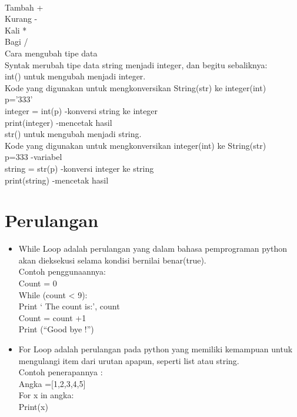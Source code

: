 \documentclass[a4paper,12pt]{report}
\begin{document}
\paragraph{}
Tambah		+\\
Kurang		-\\
Kali		*\\
Bagi		/\\
Cara mengubah tipe data\\
Syntak merubah tipe data string menjadi integer, dan begitu sebaliknya:\\
int() untuk mengubah menjadi integer.\\
Kode yang digunakan untuk mengkonversikan String(str) ke integer(int)\\
p=’333’\\
integer = int(p) -konversi string ke integer\\
print(integer) -mencetak hasil\\
str() untuk mengubah menjadi string.\\
Kode yang digunakan untuk mengkonversikan integer(int) ke String(str)\\
p=333 -variabel\\ 
string = str(p) -konversi integer ke string\\ 
print(string) -mencetak hasil\\
\section*{Perulangan}
\begin{itemize}
\item While Loop adalah perulangan yang dalam bahasa pemprograman python akan dieksekusi selama kondisi bernilai benar(true).\\
Contoh penggunaannya:\\
Count = 0\\
While (count  <  9):\\
	Print ‘ The count is:’, count\\
	Count = count +1\\
Print (“Good bye !”)\\

\item For Loop adalah perulangan pada python yang memiliki kemampuan untuk mengulangi item dari urutan apapun, seperti list atau string.\\
Contoh penerapannya :\\
Angka =[1,2,3,4,5]\\
For x in angka:\\
Print(x)\\
\end{itemize}
 
\end{document}
